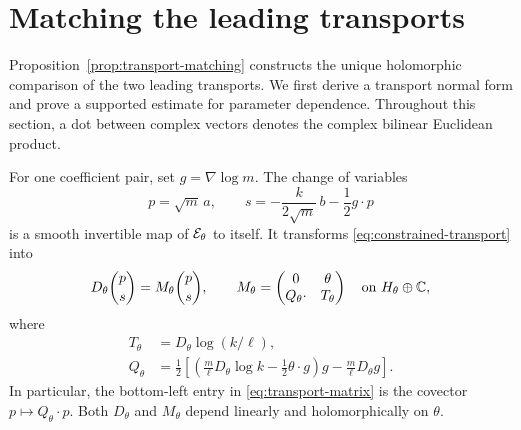\section{Matching the leading transports}\label{sec:transport-matching}

Proposition~\ref{prop:transport-matching} constructs the unique holomorphic
comparison of the two leading transports. We first derive a transport normal
form and prove a supported estimate for parameter dependence.
Throughout this section, a dot
between complex vectors denotes the complex bilinear Euclidean product.

\begin{lemma}\label{lem:transport-normal-form}
For one coefficient pair, set $g=\nabla\log m$. The change of variables
\begin{equation}\label{eq:transport-change}
 p=\sqrt m\,a,
 \qquad
 s=-\frac{k}{2\sqrt m}\,b-\frac12 g\cdot p
\end{equation}
is a smooth invertible map of $\mathcal E_\theta$ to itself. It transforms
\eqref{eq:constrained-transport} into
\begin{equation}\label{eq:transport-matrix}
 D_\theta\binom{p}{s}
   =M_\theta\binom{p}{s},
 \qquad
 M_\theta=
 \begin{pmatrix}
  0&\theta\\
  Q_\theta\cdot&T_\theta
 \end{pmatrix}
 \quad\text{on }H_\theta\oplus\mathbb C,
\end{equation}
where
\begin{equation}\label{eq:transport-coefficients}
 \begin{aligned}
  T_\theta&=D_\theta\log(k/\ell),\\
  Q_\theta&=\frac12\left[
   \left(\frac m\ell D_\theta\log k
          -\frac12\theta\cdot g\right)g
         -\frac m\ell D_\theta g\right].
 \end{aligned}
\end{equation}
In particular, the bottom-left entry in \eqref{eq:transport-matrix}
is the covector $p\mapsto Q_\theta\cdot p$. Both $D_\theta$ and
$M_\theta$ depend linearly and holomorphically on $\theta$.
\end{lemma}

